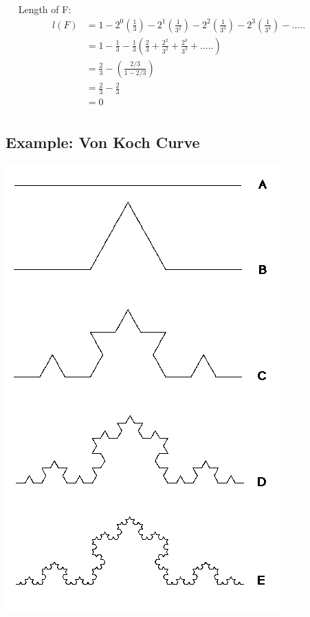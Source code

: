 \documentclass[14pt]{extarticle}
\begin{document}
\begin{enumerate}
\begin{center}
\begin{tabular}{ccl}
\end{tabular}

\end{center}

$\quad$ Length  of F:
\begin{align*}
l(F)&= 1-2^{0}\left(\frac{1}{3}\right)-2^1\left(\frac{1}{3^2}\right)-2^{2}\left(\frac{1}{3^3}\right)-2^3\left(\frac{1}{3^4}\right)- . . . . .\\
    &= 1-\frac{1}{3}-\frac{1}{3} \left( \frac{2}{3}+ \frac{2^2}{3^2} + \frac{2^3}{3^3}+ . . . . . \right)\\
    &= \frac{2}{3}-\left(\frac{2/3}{1-2/3}\right)\\
	&= \frac{2}{3}- \frac{2}{3}    \\    
    &=0 \\
\end{align*}


\subsection{Example: Von Koch Curve}
\begin{center}

\includegraphics[scale=0.55]{von.png}
\linebreak


\end{center}
\end{enumerate}
\end{document}
